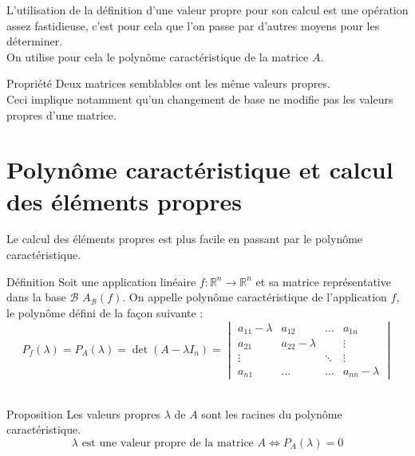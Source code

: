 L'utilisation de la définition d'une valeur propre pour son calcul est une opération assez fastidieuse, c'est pour cela que l'on passe par d'autres moyens pour les déterminer.\\
On utilise pour cela le polynôme caractéristique de la matrice $A$.
\begin{bclogo}[couleur=red!30,couleurBord=red,ombre=true,arrondi=0.1,logo=\bcoutil]{Propriété}
Deux matrices semblables ont les même valeurs propres.\\
Ceci implique notamment qu'un changement de base ne modifie pas les valeurs propres d'une matrice. 
\end{bclogo}
\section{Polynôme caractéristique et calcul des éléments propres}
Le calcul des éléments propres est plus facile en passant par le polynôme caractéristique.
\begin{bclogo}[couleur=blue!30,couleurBord=blue,arrondi=0.1,logo=\bcbook,ombre=true]{Définition}
Soit une application linéaire $f:\mathbb{R}^n\to\mathbb{R}^n$ et sa matrice représentative dans la base $\mathscr{B}$ $A_{\mathscr{B}}(f)$.
On appelle polynôme caractéristique de l'application $f$, le polynôme défini de la façon suivante :
$$P_{f}(\lambda)=P_{A}(\lambda)=\det(A-\lambda I_{n})=\begin{vmatrix}
a_{11}-\lambda & a_{12} & \hdots & a_{1n}\\
a_{21} & a_{22}-\lambda &&\vdots \\
\vdots & & \ddots & \vdots\\
a_{n1} &\hdots&\hdots& a_{nn}-\lambda
\end{vmatrix}$$
\\
\end{bclogo}

\begin{bclogo}[couleur=green!30,couleurBord=green,logo=\bccle ,ombre=true,arrondi=0.1]{Proposition}
Les valeurs propres $\lambda$ de $A$ sont les racines du polynôme caractéristique.
$$\lambda \text{ est une valeur propre de la matrice } A \Leftrightarrow P_A(\lambda) = 0$$
\end{bclogo}

